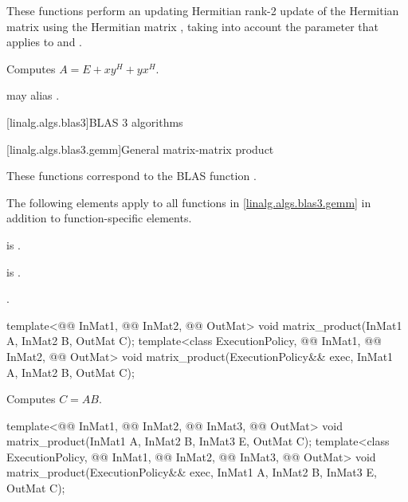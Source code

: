 \begin{itemdescr}
\pnum
These functions perform
an updating Hermitian rank-2 update of the Hermitian matrix 
using the Hermitian matrix ,
taking into account the  parameter
that applies to  and .

\pnum
\effects
Computes $A = E + x y^H + y x^H$.

\pnum
\remarks
{} may alias .
\end{itemdescr}

[linalg.algs.blas3]{BLAS 3 algorithms}

[linalg.algs.blas3.gemm]{General matrix-matrix product}

\pnum
\begin{note}
These functions correspond to the BLAS function \supercite{blas3}.
\end{note}

\pnum
The following elements apply
to all functions in \ref{linalg.algs.blas3.gemm}
in addition to function-specific elements.

\pnum
\mandates
{}
is .

\pnum
\expects
{} is .

\pnum
\complexity
{}.

%
\begin{itemdecl}
  template<@@ InMat1, @@ InMat2, @@ OutMat>
    void matrix_product(InMat1 A, InMat2 B, OutMat C);
  template<class ExecutionPolicy, @@ InMat1, @@ InMat2, @@ OutMat>
    void matrix_product(ExecutionPolicy&& exec, InMat1 A, InMat2 B, OutMat C);
\end{itemdecl}

\begin{itemdescr}
\pnum
\effects
Computes $C = A B$.
\end{itemdescr}

%
\begin{itemdecl}
template<@@ InMat1, @@ InMat2, @@ InMat3, @@ OutMat>
  void matrix_product(InMat1 A, InMat2 B, InMat3 E, OutMat C);
template<class ExecutionPolicy,
         @@ InMat1, @@ InMat2, @@ InMat3, @@ OutMat>
  void matrix_product(ExecutionPolicy&& exec, InMat1 A, InMat2 B, InMat3 E, OutMat C);
\end{itemdecl}

